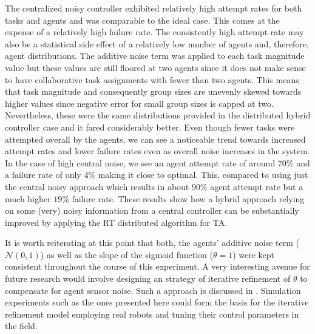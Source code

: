 \documentclass[12pt]{book}
\begin{document}
The centralized noisy controller exhibited relatively high attempt rates for both tasks and agents and was comparable to the ideal case. This comes at the expense of a relatively high failure rate. The consistently high attempt rate may also be a statistical side effect of a relatively low number of agents and, therefore, agent distributions. The additive noise term was applied to each task magnitude value but these values are still floored at two agents since it does not make sense to have collaborative task assignments with fewer than two agents. This means that task magnitude and consequently group sizes are unevenly skewed towards higher values since negative error for small group sizes is capped at two. Nevertheless, these were the same distributions provided in the distributed hybrid controller case and it fared considerably better. Even though fewer tasks were attempted overall by the agents, we can see a noticeable trend towards increased attempt rates and lower failure rates even as overall noise increases in the system. In the case of high central noise, we see an agent attempt rate of around $70\%$ and a failure rate of only $4\%$ making it close to optimal. This, compared to using just the central noisy approach which results in about $90\%$ agent attempt rate but a much higher $19\%$ failure rate. These results show how a hybrid approach relying on some (very) noisy information from a central controller can be substantially improved by applying the RT distributed algorithm for TA.

It is worth reiterating at this point that both, the agents' additive noise term ($\mathcal{N}(0,1)$) as well as the slope of the sigmoid function ($\theta = 1$) were kept consistent throughout the course of this experiment. A very interesting avenue for future research would involve designing an strategy of iterative refinement of $\theta$ to compensate for agent sensor noise. Such a approach is discussed in \cite{Correll2008b}. Simulation experiments such as the ones presented here could form the basis for the iterative refinement model employing real robots and tuning their control parameters in the field. 


\end{document}
